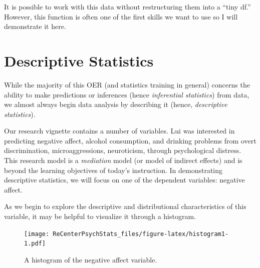\documentclass[
  11pt,
]{book}
\newenvironment{Shaded}{\begin{snugshade}}{\end{snugshade}}
\newcommand{\AttributeTok}[1]{\textcolor[rgb]{0.77,0.63,0.00}{#1}}
\newcommand{\DecValTok}[1]{\textcolor[rgb]{0.00,0.00,0.81}{#1}}
\newcommand{\FloatTok}[1]{\textcolor[rgb]{0.00,0.00,0.81}{#1}}
\newcommand{\FunctionTok}[1]{\textcolor[rgb]{0.00,0.00,0.00}{#1}}
\newcommand{\NormalTok}[1]{#1}
\newcommand{\SpecialCharTok}[1]{\textcolor[rgb]{0.00,0.00,0.00}{#1}}
\newcommand{\StringTok}[1]{\textcolor[rgb]{0.31,0.60,0.02}{#1}}
\begin{document}
It is possible to work with this data without restructuring them into a ``tiny df.'' However, this function is often one of the first skills we want to use so I will demonstrate it here.

\hypertarget{descriptive-statistics}{%
\section{Descriptive Statistics}\label{descriptive-statistics}}

While the majority of this OER (and statistics training in general) concerns the ability to make predictions or inferences (hence \emph{inferential statistics}) from data, we almost always begin data analysis by describing it (hence, \emph{descriptive statistics}).

Our research vignette contains a number of variables. Lui \citeyearpar{lui_racial_2020} was interested in predicting negative affect, alcohol consumption, and drinking problems from overt discrimination, microaggressions, neuroticism, through psychological distress. This research model is a \emph{mediation} model (or model of indirect effects) and is beyond the learning objectives of today's instruction. In demonstrating descriptive statistics, we will focus on one of the dependent variables: negative affect.

As we begin to explore the descriptive and distributional characteristics of this variable, it may be helpful to visualize it through a histogram.

\begin{Shaded}
\end{Shaded}

\begin{figure}
\centering
\texttt{[image: ReCenterPsychStats\_files/figure-latex/histogram1-1.pdf]}
\caption{\label{fig:histogram1}A histogram of the negative affect variable.}
\end{figure}
\end{document}
